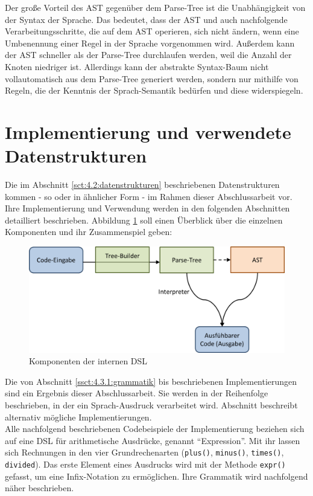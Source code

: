 Der große Vorteil des AST gegenüber dem Parse-Tree ist die Unabhängigkeit von der Syntax der Sprache. Das bedeutet, dass der AST und auch  nachfolgende Verarbeitungsschritte, die auf dem AST operieren, sich nicht ändern, wenn eine Umbenennung einer Regel in der Sprache vorgenommen wird. Außerdem kann der AST schneller als der Parse-Tree durchlaufen werden, weil die Anzahl der Knoten niedriger ist. Allerdings kann der abstrakte Syntax-Baum nicht vollautomatisch aus dem Parse-Tree generiert werden, sondern nur mithilfe von Regeln, die der Kenntnis der Sprach-Semantik bedürfen und diese widerspiegeln.

\section{Implementierung und verwendete Datenstrukturen}\label{sct:4.3:implementierung}
Die im Abschnitt \ref{sct:4.2:datenstrukturen} beschriebenen Datenstrukturen kommen - so oder in ähnlicher Form - im Rahmen dieser Abschlussarbeit vor. Ihre Implementierung und Verwendung werden in den folgenden Abschnitten detailliert beschrieben. Abbildung \ref{fig:komponenten} soll einen Überblick über die einzelnen Komponenten und ihr Zusammenspiel geben:

\begin{figure}[H]
\centering\includegraphics[width=.8\textwidth]{images/kapitel4/komponenten.png}
\caption{Komponenten der internen DSL}
\label{fig:komponenten}
\end{figure}

Die von Abschnitt \ref{ssct:4.3.1:grammatik} bis  beschriebenen Implementierungen sind ein Ergebnis dieser Abschlussarbeit. Sie werden in der Reihenfolge beschrieben, in der ein Sprach-Ausdruck verarbeitet wird. Abschnitt  beschreibt alternativ mögliche Implementierungen.\\
Alle nachfolgend beschriebenen Codebeispiele der Implementierung beziehen sich auf eine DSL für arithmetische Ausdrücke, genannt \textquotedblleft Expression\textquotedblright. Mit ihr lassen sich Rechnungen in den vier Grundrechenarten (\texttt{plus()}, \texttt{minus()}, \texttt{times()}, \texttt{divided}). Das erste Element eines Ausdrucks wird mit der Methode \texttt{expr()} gefasst, um eine Infix-Notation zu ermöglichen. Ihre Grammatik wird nachfolgend näher beschrieben.

